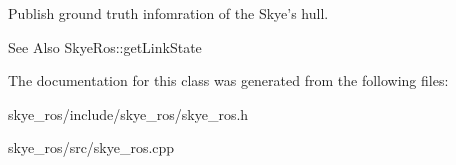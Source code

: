 Publish ground truth infomration of the Skye's hull. 

\begin{DoxySeeAlso}{See Also}
Skye\-Ros\-::get\-Link\-State 
\end{DoxySeeAlso}


The documentation for this class was generated from the following files\-:\begin{DoxyCompactItemize}
\item 
skye\-\_\-ros/include/skye\-\_\-ros/skye\-\_\-ros.\-h\item 
skye\-\_\-ros/src/skye\-\_\-ros.\-cpp\end{DoxyCompactItemize}
